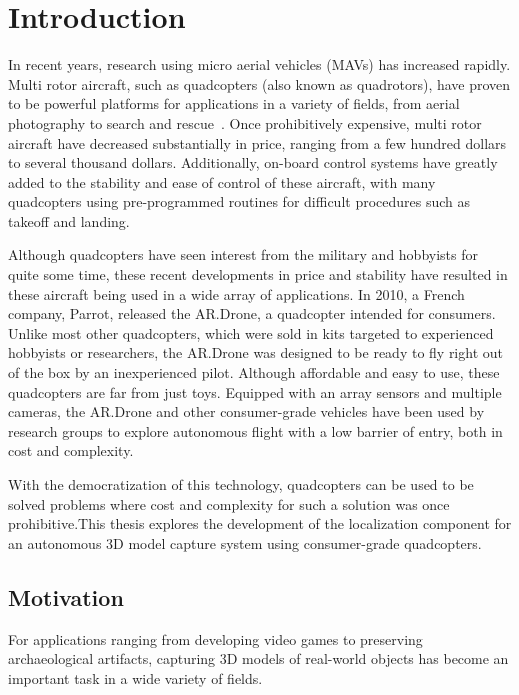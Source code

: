 
\chapter{Introduction\label{ch:intro}}

In recent years, research using micro aerial vehicles (MAVs) has increased rapidly. Multi rotor aircraft, such as quadcopters (also known as quadrotors), have proven to be powerful platforms for applications in a variety of fields, from aerial photography to search and rescue~\cite{}. Once prohibitively expensive, multi rotor aircraft have decreased substantially in price, ranging from a few hundred dollars to several thousand dollars. Additionally, on-board control systems have greatly added to the stability and ease of control of these aircraft, with many quadcopters using pre-programmed routines for difficult procedures such as takeoff and landing.


Although quadcopters have seen interest from the military and hobbyists for quite some time, these recent developments in price and stability have resulted in these aircraft being used in a wide array of applications. In 2010, a French company, Parrot, released the AR.Drone, a quadcopter intended for consumers. Unlike most other quadcopters, which were sold in kits targeted to experienced hobbyists or researchers, the AR.Drone was designed to be ready to fly right out of the box by an inexperienced pilot. Although affordable and easy to use, these quadcopters are far from just toys. Equipped with an array sensors and multiple cameras, the AR.Drone and other consumer-grade vehicles have been used by research groups to explore autonomous flight with a low barrier of entry, both in cost and complexity.

With the democratization of this technology, quadcopters can be used to be solved problems where cost and complexity for such a solution was once prohibitive.This thesis explores the development of the localization component for an autonomous 3D model capture system using consumer-grade quadcopters.

\section{Motivation}

For applications ranging from developing video games to preserving archaeological artifacts, capturing 3D models of real-world objects has become an important task in a wide variety of fields. %

